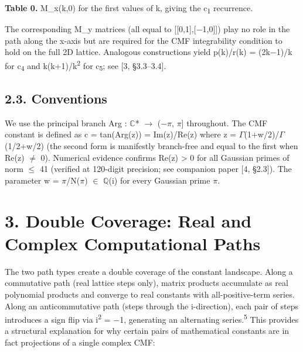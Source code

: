 \documentclass[11pt]{article}
\begin{document}
\textbf{Table 0.} M\_x(k,0) for the first values of k, giving the
c\textsubscript{1} recurrence.

The corresponding M\_y matrices (all equal to
{[}{[}0,1{]},{[}−1,0{]}{]}) play no role in the path along the x-axis
but are required for the CMF integrability condition to hold on the full
2D lattice. Analogous constructions yield p(k)/r(k) = (2k−1)/k for
c\textsubscript{4} and k(k+1)/k\textsuperscript{2} for
c\textsubscript{5}; see {[}3, §3.3--3.4{]}.

\hypertarget{conventions}{%
\subsection{2.3. Conventions}\label{conventions}}

We use the principal branch Arg : \(\mathbb{C}\)* \(\to\) (−\(\pi\),
\(\pi\){]} throughout. The CMF constant is defined as c =
\textbar tan(Arg(z))\textbar{} = \textbar Im(z)/Re(z)\textbar{} where z
= \(\Gamma\)(1+w/2)/\(\Gamma\)(1/2+w/2) (the second form is manifestly
branch-free and equal to the first when Re(z) \(\neq\) 0). Numerical
evidence confirms Re(z) \textgreater{} 0 for all Gaussian primes of norm
\(\leq\) 41 (verified at 120-digit precision; see companion paper {[}4,
§2.3{]}). The parameter w = \(\pi\)/N(\(\pi\)) \(\in\) \(\mathbb{Q}\)(i)
for every Gaussian prime \(\pi\).

\hypertarget{double-coverage-real-and-complex-computational-paths}{%
\section{3. Double Coverage: Real and Complex Computational
Paths}\label{double-coverage-real-and-complex-computational-paths}}

The two path types create a double coverage of the constant landscape.
Along a commutative path (real lattice steps only), matrix products
accumulate as real polynomial products and converge to real constants
with all-positive-term series. Along an anticommutative path (steps
through the i-direction), each pair of steps introduces a sign flip via
i\textsuperscript{2} = −1, generating an alternating
series.\textsuperscript{5} This provides a structural explanation for
why certain pairs of mathematical constants are in fact projections of a
single complex CMF:
\end{document}
